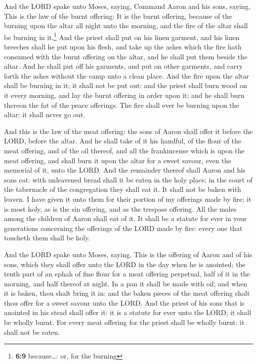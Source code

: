 And the LORD spake unto Moses, saying, 
Command Aaron and his sons, saying, This is the law of the burnt
offering: It is the burnt offering, because of the burning upon the
altar all night unto the morning, and the fire of the altar shall be
burning in it.\footnote{\textbf{6:9} because\ldots: or, for the burning}
 And the priest shall put on his linen garment, and his
linen breeches shall he put upon his flesh, and take up the ashes which
the fire hath consumed with the burnt offering on the altar, and he
shall put them beside the altar.  And he shall put off
his garments, and put on other garments, and carry forth the ashes
without the camp unto a clean place.  And the fire upon
the altar shall be burning in it; it shall not be put out: and the
priest shall burn wood on it every morning, and lay the burnt offering
in order upon it; and he shall burn thereon the fat of the peace
offerings.  The fire shall ever be burning upon the
altar; it shall never go out.

 And this is the law of the meat offering: the sons of
Aaron shall offer it before the LORD, before the altar. 
And he shall take of it his handful, of the flour of the meat offering,
and of the oil thereof, and all the frankincense which is upon the meat
offering, and shall burn it upon the altar for a sweet savour, even the
memorial of it, unto the LORD.  And the remainder thereof
shall Aaron and his sons eat: with unleavened bread shall it be eaten in
the holy place; in the court of the tabernacle of the congregation they
shall eat it.  It shall not be baken with leaven. I have
given it unto them for their portion of my offerings made by fire; it is
most holy, as is the sin offering, and as the trespass offering.
 All the males among the children of Aaron shall eat of
it. It shall be a statute for ever in your generations concerning the
offerings of the LORD made by fire: every one that toucheth them shall
be holy.

 And the LORD spake unto Moses, saying, 
This is the offering of Aaron and of his sons, which they shall offer
unto the LORD in the day when he is anointed; the tenth part of an ephah
of fine flour for a meat offering perpetual, half of it in the morning,
and half thereof at night.  In a pan it shall be made
with oil; and when it is baken, thou shalt bring it in: and the baken
pieces of the meat offering shalt thou offer for a sweet savour unto the
LORD.  And the priest of his sons that is anointed in his
stead shall offer it: it is a statute for ever unto the LORD; it shall
be wholly burnt.  For every meat offering for the priest
shall be wholly burnt: it shall not be eaten.

